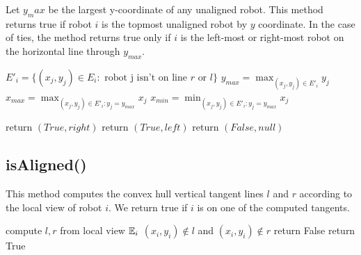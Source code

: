\documentclass[preprint,10pt]{elsarticle}
\begin{document}
	Let $y_max$ be the largest y-coordinate of any unaligned robot. 
	This method returns true if robot $i$ is the topmost unaligned robot by $y$ coordinate. In the
	case of ties, the method returns true only if $i$ is the left-most or right-most 
	robot on the horizontal line through $y_{max}$.

\begin{algorithm}[H]
\begin{algorithmic}[1]
	\State $E'_i = \{ (x_j, y_j) \in E_i : \text{ robot j isn't on line } r \text{ or } l\}$
	\State $y_{max} = \max_{(x_j, y_j) \in E'_i}{y_j}$ 
	\State $x_{max} = \max_{(x_j, y_j) \in E'_i : y_j = y_{max} }{x_j}$ 
	\State $x_{min} = \min_{(x_j, y_j) \in E'_i : y_j = y_{max} }{x_j}$ 

		\State return $(True, right)$
		\State return $(True, left)$
	\Else
		\State return $(False, null)$
	\EndIf

\EndProcedure
\end{algorithmic}
\end{algorithm}

\subsection{isAligned()} 

	This method computes the convex hull vertical tangent lines $l$ and $r$ according
	to the local view of robot $i$. We return true if $i$ is on one of the 
	computed tangents.
\begin{algorithm}[H]
\begin{algorithmic}[1]
	\State compute $l,r$ from local view $\mathbb{E}_i$
	\If $(x_i, y_i) \notin  l$ and $(x_i, y_i) \notin r$
		\State return False
	\Else 
		\State return True
	\EndIf
\EndProcedure
\end{algorithmic}
\end{algorithm}
\end{document}
